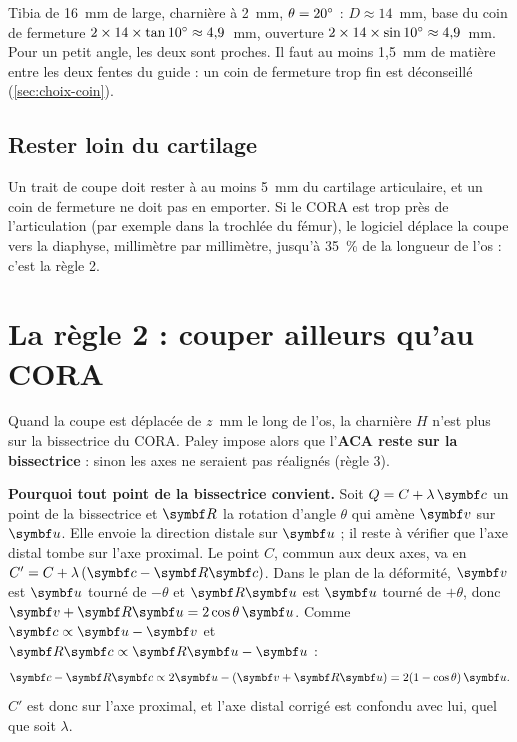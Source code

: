 \begin{exemple}
Tibia de 16~mm de large, charnière à 2~mm, $\theta = 20^\circ$ : $D \approx 14$~mm, base du coin de fermeture
$2 \times 14 \times \tan 10^\circ \approx 4{,}9$~mm, ouverture $2 \times 14 \times \sin 10^\circ \approx 4{,}9$~mm. Pour un
petit angle, les deux sont proches. Il faut au moins 1,5~mm de matière entre les deux fentes du guide : un coin de
fermeture trop fin est déconseillé (\cref{sec:choix-coin}).
\end{exemple}

\subsection{Rester loin du cartilage}

Un trait de coupe doit rester à au moins 5~mm du cartilage articulaire, et un coin de fermeture ne doit pas en
emporter. Si le CORA est trop près de l'articulation (par exemple dans la trochlée du fémur), le logiciel déplace la
coupe vers la diaphyse, millimètre par millimètre, jusqu'à 35~\% de la longueur de l'os : c'est la règle 2.

\section{La règle 2 : couper ailleurs qu'au CORA}
\label{sec:regle2}

Quand la coupe est déplacée de $z$~mm le long de l'os, la charnière $H$ n'est plus sur la bissectrice du CORA. Paley
impose alors que l'\textbf{ACA reste sur la bissectrice} : sinon les axes ne seraient pas réalignés (règle 3).

\textbf{Pourquoi tout point de la bissectrice convient.} Soit $Q = C + \lambda\,\vb{c}$ un point de la bissectrice et
$\mt{R}$ la rotation d'angle $\theta$ qui amène $\vb{v}$ sur $\vb{u}$. Elle envoie la direction distale sur
$\vb{u}$ ; il reste à vérifier que l'axe distal tombe sur l'axe proximal. Le point $C$, commun aux deux axes, va en
$C' = C + \lambda\,(\vb{c} - \mt{R}\vb{c})$. Dans le plan de la déformité, $\vb{v}$ est $\vb{u}$ tourné de $-\theta$
et $\mt{R}\vb{u}$ est $\vb{u}$ tourné de $+\theta$, donc $\vb{v} + \mt{R}\vb{u} = 2\cos\theta\,\vb{u}$. Comme
$\vb{c} \propto \vb{u} - \vb{v}$ et $\mt{R}\vb{c} \propto \mt{R}\vb{u} - \vb{u}$ :
\begin{equation}
  \vb{c} - \mt{R}\vb{c} \propto 2\vb{u} - (\vb{v} + \mt{R}\vb{u}) = 2(1 - \cos\theta)\,\vb{u}.
\end{equation}
$C'$ est donc sur l'axe proximal, et l'axe distal corrigé est confondu avec lui, quel que soit $\lambda$.

